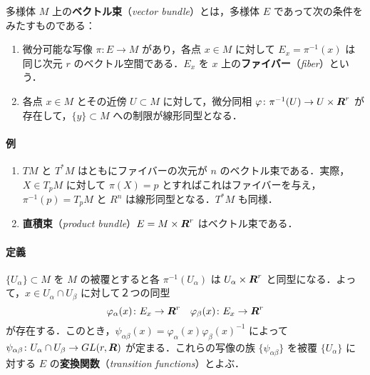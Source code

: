 \documentclass[pandoc,base=10pt,b5j,precisetext]{bxjsarticle}
\providecommand{\tightlist}{%
  \setlength{\itemsep}{0pt}\setlength{\parskip}{0pt}}
\let\oldparagraph\paragraph
\renewcommand{\paragraph}[1]{\oldparagraph{#1}\mbox{}}
\begin{document}
多様体 \(M\) 上の\textbf{ベクトル束}（\emph{vector bundle}）とは，多様体
\(E\) であって次の条件をみたすものである：

\begin{enumerate}
\def\labelenumi{\roman{enumi})}
\tightlist
\item
  微分可能な写像 \(\pi \colon E \to M\) があり，各点 \(x \in M\)
  に対して \(E_x = \pi^{-1}(x)\) は同じ次元 \(r\)
  のベクトル空間である．\(E_x\) を \(x\)
  上の\textbf{ファイバー}（\emph{fiber}）という．
\item
  各点 \(x \in M\) とその近傍 \(U \subset M\) に対して，微分同相
  \(\varphi \colon \pi^{-1}(U) \to U \times \boldsymbol{R}^r\)
  が存在して，\(\{ y \} \subset M\) への制限が線形同型となる．
\end{enumerate}

\hypertarget{ux4f8b}{%
\paragraph{例}\label{ux4f8b}}

\begin{enumerate}
\def\labelenumi{\roman{enumi})}
\tightlist
\item
  \(TM\) と \(T^*M\) はともにファイバーの次元が \(n\)
  のベクトル束である．実際，\(X \in T_pM\) に対して \(\pi(X) = p\)
  とすればこれはファイバーを与え，\(\pi^{-1}(p) = T_pM\) と \(R^n\)
  は線形同型となる．\(T^*M\) も同様．
\item
  \textbf{直積束}（\emph{product bundle}）\(E = M \times \boldsymbol{R}^r\)
  はベクトル束である．
\end{enumerate}

\hypertarget{ux5b9aux7fa9-1}{%
\paragraph{定義}\label{ux5b9aux7fa9-1}}

\(\{ U_\alpha \} \subset M\) を \(M\) の被覆とすると各
\(\pi^{-1}(U_\alpha)\) は \(U_\alpha \times \boldsymbol{R}^r\)
と同型になる．よって，\(x \in U_\alpha \cap U_\beta\) に対して２つの同型
\[
\varphi_\alpha(x) \colon E_x \to \boldsymbol{R}^r\quad \varphi_\beta(x) \colon E_x \to \boldsymbol{R}^r
\]
が存在する．このとき，\(\psi_{\alpha\beta}(x) = \varphi_\alpha(x) \varphi_\beta(x)^{-1}\)
によって
\(\psi_{\alpha\beta} \colon U_\alpha \cap U_\beta \to GL(r, \boldsymbol{R})\)
が定まる．これらの写像の族 \(\{ \psi_{\alpha\beta} \}\) を被覆
\(\{ U_\alpha \}\) に対する \(E\) の\textbf{変換関数}（\emph{transition
functions}）とよぶ．
\end{document}
